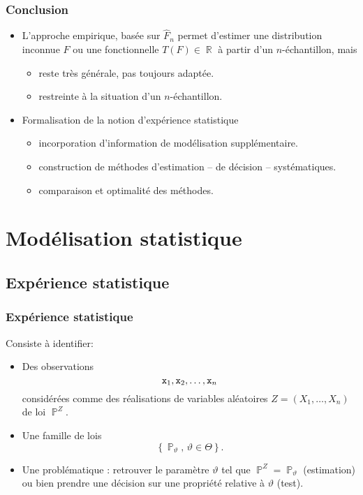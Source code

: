 ﻿\documentclass{beamer}
\DeclareMathOperator{\R}{{\mathbb R}}
\DeclareMathOperator{\PP}{{\mathbb P}}
\begin{document}

\begin{frame}
\frametitle{Conclusion}
\begin{itemize}
\item {\color{red}L'approche empirique}, basée sur $\widehat F_n$ permet d'estimer une distribution inconnue $F$ ou une fonctionnelle $T(F)\in \R$ à partir d'un $n$-échantillon, mais
\begin{itemize}
\item reste très générale, pas toujours adaptée.
\item restreinte à la situation d'un $n$-échantillon.
\end{itemize}
\item Formalisation de la notion {\color{red}d'expérience statistique }
\begin{itemize}
\item incorporation d'information de modélisation {\color{red}supplémentaire}.
\item construction de méthodes d'estimation -- de décision -- {\color{red}systématiques}.
\item comparaison et {\color{red}optimalité} des méthodes.
\end{itemize}
\end{itemize}
\end{frame}

\section{Modélisation statistique}
\subsection{Expérience statistique}
\begin{frame}
\frametitle{Expérience statistique} Consiste à identifier:
\begin{itemize}
\item {\color{red}Des observations}
$${\tt x}_1,{\tt x}_2,\ldots, {\tt x}_n$$
{\color{red}considérées} comme des {\color{red} réalisations} de variables aléatoires $Z = (X_1,\ldots, X_n)$ de loi $\PP^Z$.
\item {\color{red}Une famille de lois}
$$\left\{\PP_\vartheta,\,\vartheta \in \Theta\right\}.$$
\item {\color{red}Une problématique} : retrouver le paramètre
$\vartheta$ tel que $\PP^Z=\PP_\vartheta$ (estimation) ou bien prendre une décision sur une propriété relative à $\vartheta$ (test).
\end{itemize}
\end{frame}
\end{document}
